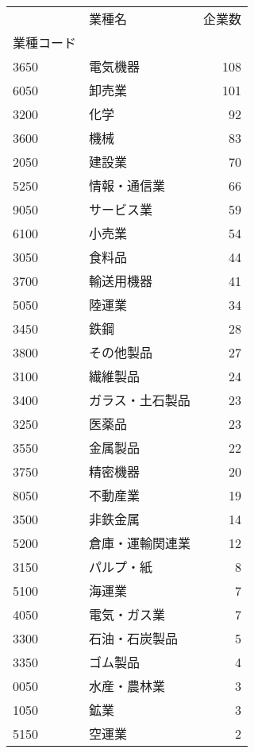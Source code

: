 \begin{tabular}{llr}
\toprule
{} &       業種名 &  企業数 \\
業種コード &           &      \\
\midrule
3650  &      電気機器 &  108 \\
6050  &       卸売業 &  101 \\
3200  &        化学 &   92 \\
3600  &        機械 &   83 \\
2050  &       建設業 &   70 \\
5250  &    情報・通信業 &   66 \\
9050  &     サービス業 &   59 \\
6100  &       小売業 &   54 \\
3050  &       食料品 &   44 \\
3700  &     輸送用機器 &   41 \\
5050  &       陸運業 &   34 \\
3450  &        鉄鋼 &   28 \\
3800  &     その他製品 &   27 \\
3100  &      繊維製品 &   24 \\
3400  &  ガラス・土石製品 &   23 \\
3250  &       医薬品 &   23 \\
3550  &      金属製品 &   22 \\
3750  &      精密機器 &   20 \\
8050  &      不動産業 &   19 \\
3500  &      非鉄金属 &   14 \\
5200  &  倉庫・運輸関連業 &   12 \\
3150  &     パルプ・紙 &    8 \\
5100  &       海運業 &    7 \\
4050  &    電気・ガス業 &    7 \\
3300  &   石油・石炭製品 &    5 \\
3350  &      ゴム製品 &    4 \\
0050  &    水産・農林業 &    3 \\
1050  &        鉱業 &    3 \\
5150  &       空運業 &    2 \\
\bottomrule
\end{tabular}
